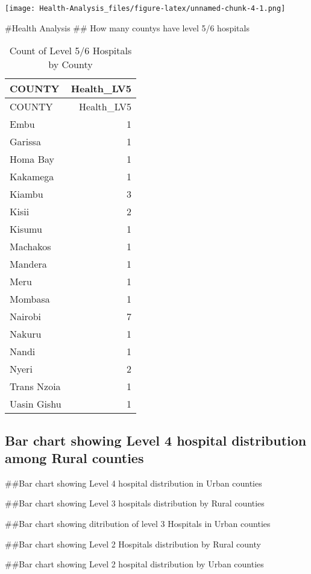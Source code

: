 \documentclass[
]{article}
\begin{document}
\texttt{[image: Health-Analysis\_files/figure-latex/unnamed-chunk-4-1.png]}

\#Health Analysis \#\# How many countys have level 5/6 hospitals

\begin{longtable}[]{@{}lr@{}}
\caption{Count of Level 5/6 Hospitals by County}\tabularnewline
\toprule\noalign{}
COUNTY & Health\_LV5 \\
\midrule\noalign{}
\endfirsthead
\toprule\noalign{}
COUNTY & Health\_LV5 \\
\midrule\noalign{}
\endhead
\bottomrule\noalign{}
\endlastfoot
Embu & 1 \\
Garissa & 1 \\
Homa Bay & 1 \\
Kakamega & 1 \\
Kiambu & 3 \\
Kisii & 2 \\
Kisumu & 1 \\
Machakos & 1 \\
Mandera & 1 \\
Meru & 1 \\
Mombasa & 1 \\
Nairobi & 7 \\
Nakuru & 1 \\
Nandi & 1 \\
Nyeri & 2 \\
Trans Nzoia & 1 \\
Uasin Gishu & 1 \\
\end{longtable}

\hypertarget{bar-chart-showing-level-4-hospital-distribution-among-rural-counties}{%
\subsection{Bar chart showing Level 4 hospital distribution among Rural
counties}\label{bar-chart-showing-level-4-hospital-distribution-among-rural-counties}}

\#\#Bar chart showing Level 4 hospital distribution in Urban counties

\#\#Bar chart showing Level 3 hospitals distribution by Rural counties

\#\#Bar chart showing ditribution of level 3 Hospitals in Urban counties

\#\#Bar chart showing Level 2 Hospitals distribution by Rural county

\#\#Bar chart showing Level 2 hospital distribution by Urban counties
\end{document}
